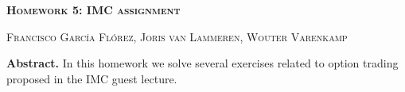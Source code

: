 \documentclass[8 pt]{article}
\begin{document}
\begin{minipage}{\textwidth}
    \centering
    \Large \textbf{\textsc{Homework 5: IMC assignment}}
    \vspace{0.5cm}

    \small \textsc{Francisco García Flórez, Joris van Lammeren, Wouter Varenkamp}
    \vspace{0.5cm}

    \begin{minipage}{0.8\textwidth}
      \textbf{Abstract.} In this homework we solve several exercises related to option trading proposed in the IMC guest lecture.
    \end{minipage}
\end{minipage}

\vspace{0.5cm}
\end{document}
